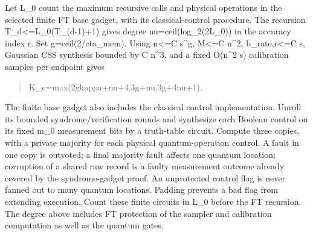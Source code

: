 \documentclass[
]{article}
\begin{document}
Let L\_0 count the maximum recursive calls and physical operations in
the selected finite FT base gadget, with its classical-control
procedure. The recursion
T\allowbreak{}\_\allowbreak{}d\allowbreak{}<\allowbreak{}=\allowbreak{}L\allowbreak{}\_\allowbreak{}0\allowbreak{}(\allowbreak{}T\allowbreak{}\_\allowbreak{}(\allowbreak{}d\allowbreak{}-\allowbreak{}1\allowbreak{})\allowbreak{}+\allowbreak{}1\allowbreak{})
gives degree
n\allowbreak{}u\allowbreak{}=\allowbreak{}c\allowbreak{}e\allowbreak{}i\allowbreak{}l\allowbreak{}(\allowbreak{}l\allowbreak{}o\allowbreak{}g\allowbreak{}\_\allowbreak{}2\allowbreak{}(\allowbreak{}2\allowbreak{}L\allowbreak{}\_\allowbreak{}0\allowbreak{})\allowbreak{})
in the accuracy index r. Set
g\allowbreak{}=\allowbreak{}c\allowbreak{}e\allowbreak{}i\allowbreak{}l\allowbreak{}(\allowbreak{}2\allowbreak{}/\allowbreak{}e\allowbreak{}t\allowbreak{}a\allowbreak{}\_\allowbreak{}m\allowbreak{}e\allowbreak{}m\allowbreak{})\allowbreak{}.
Using n\textless=C s\^{}g, M\textless=C n\^{}2, b\_rate,r\textless=C s,
Gaussian CSS synthesis bounded by C n\^{}3, and a fixed O(n\^{}2 s)
calibration samples per endpoint gives

\begin{quote}\small\ttfamily\raggedright\setlength{\parskip}{0pt}
\noindent K\allowbreak{}\_\allowbreak{}c\allowbreak{}=\allowbreak{}m\allowbreak{}a\allowbreak{}x\allowbreak{}(\allowbreak{}2\allowbreak{}g\allowbreak{}\hspace*{0.525em}\allowbreak{}k\allowbreak{}a\allowbreak{}p\allowbreak{}p\allowbreak{}a\allowbreak{}+\allowbreak{}n\allowbreak{}u\allowbreak{}+\allowbreak{}4\allowbreak{},\allowbreak{}\hspace*{0.525em}\allowbreak{}3\allowbreak{}g\allowbreak{}+\allowbreak{}n\allowbreak{}u\allowbreak{},\allowbreak{}\hspace*{0.525em}\allowbreak{}3\allowbreak{}g\allowbreak{}+\allowbreak{}4\allowbreak{}n\allowbreak{}u\allowbreak{}+\allowbreak{}1\allowbreak{})\allowbreak{}.\par
\end{quote}

The finite base gadget also includes the classical control
implementation. Unroll its bounded
s\allowbreak{}y\allowbreak{}n\allowbreak{}d\allowbreak{}r\allowbreak{}o\allowbreak{}m\allowbreak{}e\allowbreak{}/\allowbreak{}v\allowbreak{}e\allowbreak{}r\allowbreak{}i\allowbreak{}f\allowbreak{}i\allowbreak{}c\allowbreak{}a\allowbreak{}t\allowbreak{}i\allowbreak{}o\allowbreak{}n
rounds and synthesize each Boolean control on its fixed m\_0 measurement
bits by a truth-table circuit. Compute three copies, with a private
majority for each physical quantum-operation control. A fault in one
copy is outvoted; a final majority fault affects one quantum location;
corruption of a shared raw record is a faulty measurement outcome
already covered by the syndrome-gadget proof. An unprotected control
flag is never fanned out to many quantum locations. Padding prevents a
bad flag from extending execution. Count these finite circuits in L\_0
before the FT recursion. The degree above includes FT protection of the
sampler and calibration computation as well as the quantum gates.
\end{document}
